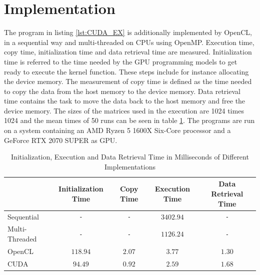 \section{Implementation}
The program in listing \ref{lst:CUDA_EX} is additionally implemented by OpenCL, in a sequential way and multi-threaded on CPUs using OpenMP.
Execution time, copy time, initialization time and data retrieval time are measured.
Initialization time is referred to the time needed by the GPU programming models to get ready to execute the kernel function.
These steps include for instance allocating the device memory.
The measurement of copy time is defined as the time needed to copy the data from the host memory to the device memory.
Data retrieval time contains the task to move the data back to the host memory and free the device memory.
The sizes of the matrices used in the execution are 1024 times 1024 and the mean times of 50 runs can be seen in table \ref{tab:time}.
The programs are run on a system containing an AMD Ryzen 5 1600X Six-Core processor and a GeForce RTX 2070 SUPER as GPU.
\begin{table}[htbp]
  \centering
  \begin{tabular}{|l|c|c|c|c|}
	\hline
	  & Initialization Time & Copy Time & Execution Time & Data Retrieval Time \\\hline
	  Sequential & \texttt{-} & \texttt{-} & \(3402.94\) & \texttt{-} \\\hline
	  Multi-Threaded & \texttt{-}& \texttt{-} & \(1126.24\) & \texttt{-} \\\hline
	  OpenCL & \(118.94\) & \(2.07\) & \(3.77\) & \(1.30\) \\\hline
	  CUDA & \(94.49\) & \(0.92\) & \(2.59\) & \(1.68\) \\\hline
  \end{tabular}
    \caption{Initialization, Execution and Data Retrieval Time in Milliseconds of Different Implementations}
  \label{tab:time}
\end{table}


